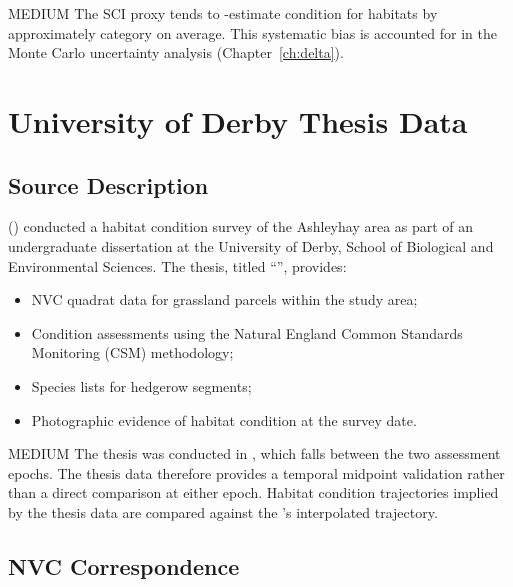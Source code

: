 \begin{confidencebox}{MEDIUM}
The SCI proxy tends to -estimate condition for  habitats by approximately  category on average. This systematic bias is accounted for in the Monte Carlo uncertainty analysis (Chapter~\ref{ch:delta}).
\end{confidencebox}


\section{University of Derby Thesis Data}

\subsection{Source Description}

 () conducted a habitat condition survey of the Ashleyhay area as part of an undergraduate dissertation at the University of Derby, School of Biological and Environmental Sciences. The thesis, titled ``'', provides:

\begin{itemize}[nosep]
  \item NVC quadrat data for  grassland parcels within the study area;
  \item Condition assessments using the Natural England Common Standards Monitoring (CSM) methodology;
  \item Species lists for  hedgerow segments;
  \item Photographic evidence of habitat condition at the survey date.
\end{itemize}

\begin{confidencebox}{MEDIUM}
The thesis was conducted in , which falls between the two assessment epochs. The thesis data therefore provides a temporal midpoint validation rather than a direct comparison at either epoch. Habitat condition trajectories implied by the thesis data are compared against the \BDE{}'s interpolated trajectory.
\end{confidencebox}

\subsection{NVC Correspondence}

